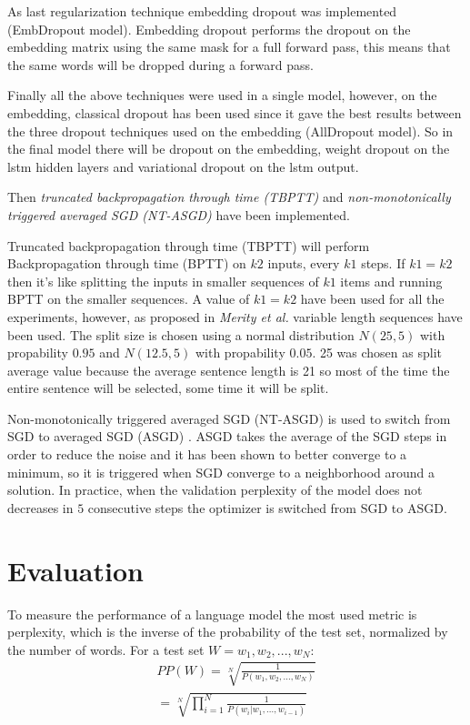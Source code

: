 \documentclass[a4paper]{article}
\begin{document}
As last regularization technique embedding dropout was implemented (EmbDropout model). Embedding dropout performs the dropout on the embedding 
matrix using the same mask for a full forward pass, this means that the same words will be dropped during a forward pass.

Finally all the above techniques were used in a single model, however, on the embedding, classical dropout has been used since it 
gave the best results between the three dropout techniques used on the embedding (AllDropout model). So in the final model there will be dropout on the embedding,
weight dropout on the lstm hidden layers and variational dropout on the lstm output.

Then \textit{truncated backpropagation through time (TBPTT)} and \textit{non-monotonically triggered averaged SGD (NT-ASGD)} 
have been implemented.

Truncated backpropagation through time (TBPTT) will perform Backpropagation through time (BPTT) on $k2$ inputs, 
every $k1$ steps. If $k1 = k2$ then it's like splitting the inputs in smaller sequences of $k1$ items and running 
BPTT on the smaller sequences. A value of $k1 = k2$ have been used for all the experiments, however, 
as proposed in \textit{Merity et al.}\cite{Merity} variable length sequences have been used. 
The split size is chosen using a normal distribution $N(25,5)$ with propability $0.95$ and 
$N(12.5, 5)$ with propability $0.05$. 25 was chosen as split average value because the average sentence length is 21 
so most of the time the entire sentence will be selected, some time it will be split.

Non-monotonically triggered averaged SGD (NT-ASGD) is used to switch from SGD to averaged SGD (ASGD) \cite{ASGD}.
ASGD takes the average of the SGD steps in order to reduce the noise and it has been shown to better converge to a minimum, 
so it is triggered when SGD converge to a neighborhood around a solution.
In practice, when the validation perplexity of the model does not decreases in $5$ consecutive steps the optimizer is switched
from SGD to ASGD.

\section{Evaluation}
To measure the performance of a language model the most used metric is perplexity, which is the inverse of 
the probability of the test set, normalized by the number of words. For a test set $W = w_1, w_2, ..., w_N $:
\begin{equation}
    \begin{split}
    PP(W) = \sqrt[N]{\frac{1}{P(w_1,w_2,...,w_N)}} \\
    = \sqrt[N]{\prod_{i=1}^{N}\frac{1}{P(w_i|w_1, ..., w_{i-1})}}
    \end{split}
\end{equation}
\end{document}
